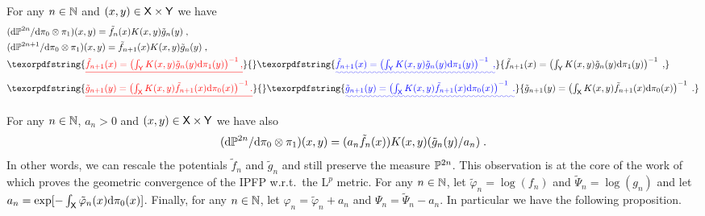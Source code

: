 \documentclass[11pt,a4paper]{article}
\providecommand{\DIFaddtex}[1]{{\protect\color{blue}\uwave{#1}}} %
\providecommand{\DIFdeltex}[1]{{\protect\color{red}\sout{#1}}}                      %
\providecommand{\DIFaddbegin}{} %
\providecommand{\DIFaddend}{} %
\providecommand{\DIFdelbegin}{} %
\providecommand{\DIFdelend}{} %
\providecommand{\DIFadd}[1]{\texorpdfstring{\DIFaddtex{#1}}{#1}} %
\providecommand{\DIFdel}[1]{\texorpdfstring{\DIFdeltex{#1}}{}} %
\begin{document}
\begin{proposition}
  For any $n \in \mathbb{N}$ and $(x, y) \in \mathsf{X} \times \mathsf{Y}$ we have
  \begin{align}
    &(\rmd \Pbb^{2n} / \rmd \pi_0 \otimes \pi_1)(x,y) = \tilde{f}_n(x) K(x,y) \tilde{g}_n(y) \DIFaddbegin \eqsp \DIFaddend , \\
    &(\rmd \Pbb^{2n+1} / \rmd \pi_0 \otimes \pi_1)(x,y) = \tilde{f}_{n+1}(x) K(x,y) \tilde{g}_n(y) \DIFaddbegin \eqsp \DIFaddend , \\
    &\DIFdelbegin \DIFdel{\textstyle{\tilde{f}_{n+1}(x) = \parenthese{\int_{\msy} K(x,y) \tilde{g}_n(y) \rmd \pi_1(y)}^{-1},} }\DIFdelend \DIFaddbegin \DIFadd{\textstyle{\tilde{f}_{n+1}(x) = \parenthese{\int_{\msy} K(x,y) \tilde{g}_n(y) \rmd \pi_1(y)}^{-1} \eqsp ,} }\DIFaddend \\
    &\DIFdelbegin \DIFdel{\textstyle{\tilde{g}_{n+1}(y) = \parenthese{\int_{\msx} K(x,y) \tilde{f}_{n+1}(x) \rmd \pi_0(x)}^{-1}.} 
  }\DIFdelend \DIFaddbegin \DIFadd{\textstyle{\tilde{g}_{n+1}(y) = \parenthese{\int_{\msx} K(x,y) \tilde{f}_{n+1}(x) \rmd \pi_0(x)}^{-1} \eqsp .} 
  }\DIFaddend \end{align}
\end{proposition}
For any $n \in \mathbb{N}$, $a_n > 0$ and $(x,y) \in \mathsf{X} \times \mathsf{Y}$ we have also
\begin{equation}
  (\rmd \Pbb^{2n} / \rmd \pi_0 \otimes \pi_1)(x,y) = (a_n \tilde{f}_n(x)) K(x,y) (\tilde{g}_n(y)/a_n) \DIFaddbegin \eqsp \DIFaddend .
\end{equation}
In other words, we can rescale the potentials $\tilde{f}_n$ and $\tilde{g}_n$ and
still preserve the measure $\mathbb{P}^{2n}$. This observation is at the core of the
work of \cite{carlier2020differential} which proves the geometric convergence of
the IPFP w.r.t.\ the $\mathrm{L}^p$ metric.  For any $n \in \mathbb{N}$, let
$\tilde{\varphi}_n = \log(f_n)$ and $\tilde{\Psi}_n = \log(g_n)$ and let
$a_n = \exp[-\int_{\mathsf{X}} \tilde{\varphi}_n(x) \mathrm{d} \pi_0(x)]$. Finally, for any
$n \in \mathbb{N}$, let $\varphi_n = \tilde{\varphi}_n + a_n$ and
$\Psi_n = \tilde{\Psi}_n - a_n$. In particular we have the following proposition.
\end{document}

